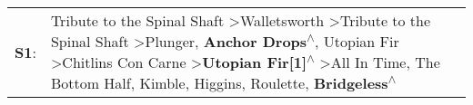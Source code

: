\begin{supertabular}{p{0.03\textwidth}p{0.92\textwidth}}
 \textbf{S1}:  &  Tribute to the Spinal Shaft\textsuperscript{} \textgreater \enspace Walletsworth\textsuperscript{} \textgreater \enspace Tribute to the Spinal Shaft\textsuperscript{} \textgreater \enspace Plunger\textsuperscript{}, \enspace \textbf{Anchor Drops\textsuperscript{$\wedge$}}, \enspace Utopian Fir\textsuperscript{} \textgreater \enspace Chitlins Con Carne\textsuperscript{} \textgreater \enspace \textbf{Utopian Fir[1]\textsuperscript{$\wedge$}} \textgreater \enspace All In Time\textsuperscript{}, \enspace The Bottom Half\textsuperscript{}, \enspace Kimble\textsuperscript{}, \enspace Higgins\textsuperscript{}, \enspace Roulette\textsuperscript{}, \enspace \textbf{Bridgeless\textsuperscript{$\wedge$}}  \enspace  \\
\end{supertabular}
